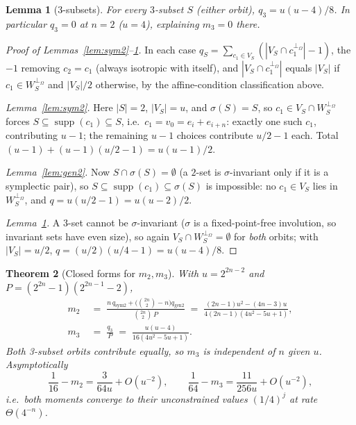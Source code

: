 \documentclass[11pt,a4paper]{article}
\theoremstyle{plain}
\newtheorem{theorem}{Theorem}[section]
\newtheorem{lemma}[theorem]{Lemma}
\theoremstyle{definition}
\begin{document}
\begin{lemma}[$3$-subsets]
\label{lem:three}
For every $3$-subset $S$ (either orbit), $q_{3} = u(u-4)/8$. In particular $q_3 = 0$ at $n=2$ ($u=4$), explaining $m_3 = 0$ there.
\end{lemma}

\begin{proof}[Proof of Lemmas~\ref{lem:sym2}--\ref{lem:three}]
In each case $q_S = \sum_{c_1 \in V_S}(|V_S \cap c_1^{\perp_\Omega}| - 1)$, the $-1$ removing $c_2 = c_1$ (always isotropic with itself), and $|V_S \cap c_1^{\perp_\Omega}|$ equals $|V_S|$ if $c_1 \in W_S^{\perp_\Omega}$ and $|V_S|/2$ otherwise, by the affine-condition classification above.

\emph{Lemma~\ref{lem:sym2}.} Here $|S|=2$, $|V_S| = u$, and $\sigma(S) = S$, so $c_1 \in V_S \cap W_S^{\perp_\Omega}$ forces $S \subseteq \operatorname{supp}(c_1) \subseteq S$, i.e.\ $c_1 = v_0 = e_i + e_{i+n}$: exactly one such $c_1$, contributing $u-1$; the remaining $u-1$ choices contribute $u/2-1$ each. Total $(u-1) + (u-1)(u/2-1) = u(u-1)/2$.

\emph{Lemma~\ref{lem:gen2}.} Now $S \cap \sigma(S) = \emptyset$ (a $2$-set is $\sigma$-invariant only if it is a symplectic pair), so $S \subseteq \operatorname{supp}(c_1) \subseteq \sigma(S)$ is impossible: no $c_1 \in V_S$ lies in $W_S^{\perp_\Omega}$, and $q = u(u/2-1) = u(u-2)/2$.

\emph{Lemma~\ref{lem:three}.} A $3$-set cannot be $\sigma$-invariant ($\sigma$ is a fixed-point-free involution, so invariant sets have even size), so again $V_S \cap W_S^{\perp_\Omega} = \emptyset$ for \emph{both} orbits; with $|V_S| = u/2$, $q = (u/2)(u/4-1) = u(u-4)/8$.
\end{proof}

\begin{theorem}[Closed forms for $m_2, m_3$]
\label{thm:mj-closed}
With $u = 2^{2n-2}$ and $P = (2^{2n}-1)(2^{2n-1}-2)$,
\begin{align*}
m_2 \;&=\; \frac{n\,q_{\mathrm{sym2}} + \bigl(\binom{2n}{2}-n\bigr)q_{\mathrm{gen2}}}{\binom{2n}{2}\,P}
\;=\; \frac{(2n-1)u^2-(4n-3)u}{4(2n-1)(4u^2-5u+1)},\\
m_3 \;&=\; \frac{q_3}{P} \;=\; \frac{u(u-4)}{16(4u^2-5u+1)}.
\end{align*}
Both 3-subset orbits contribute equally, so $m_3$ is independent of $n$ given $u$. Asymptotically
\[
\frac{1}{16} - m_2 = \frac{3}{64u} + O(u^{-2}), \qquad
\frac{1}{64} - m_3 = \frac{11}{256u} + O(u^{-2}),
\]
i.e.\ both moments converge to their unconstrained values $(1/4)^j$ at rate $\Theta(4^{-n})$.
\end{theorem}
\end{document}
